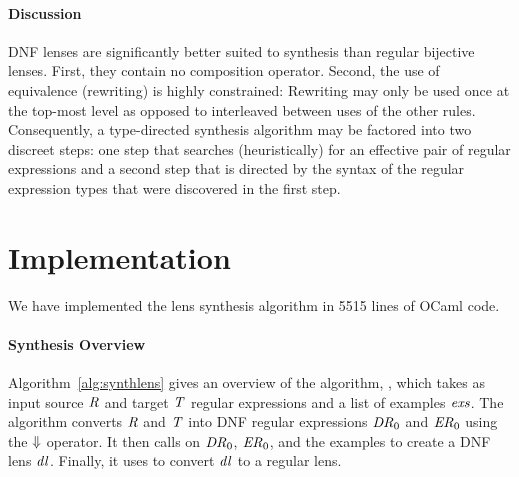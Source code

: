 \documentclass[numbers,10pt,preprint\ifanon ,nocopyrightspace\fi]{sigplanconf}
\begin{document}
\paragraph*{Discussion} 
DNF lenses are significantly better suited to synthesis than regular
bijective lenses.  First, they contain no composition operator.
Second, the use of equivalence (rewriting) is highly constrained:  Rewriting
may only be used once at the top-most level as opposed to interleaved
between uses of the other rules.  Consequently, a type-directed synthesis
algorithm may be factored into two discreet steps: one step that
searches (heuristically) for an effective pair of regular expressions
and a second step that is directed by the syntax of the regular expression
types that were discovered in the first step.

\section{Implementation}
\label{implementation}
We have implemented the lens synthesis algorithm in 5515 lines
of OCaml code. 

\paragraph*{Synthesis Overview}
Algorithm~\ref{alg:synthlens} gives an overview of the 
algorithm, \SynthLens{}, which takes as input source $\mathit{R}$ and
target $\mathit{T}$ regular expressions and a list of examples
$\mathit{exs}$.
The algorithm converts
$\mathit{R}$ and $\mathit{T}$ into DNF regular expressions
$\mathit{DR}_0$ and $\mathit{ER}_0$
using the $\Downarrow$ operator.
It then calls \SynthDNFLens{}
on $\mathit{DR}_0$, $\mathit{ER}_0$, and the examples
to create a DNF lens $\mathit{dl}$.  
Finally, it uses \ToLens{} to convert $\mathit{dl}$ to a regular lens.
\end{document}
